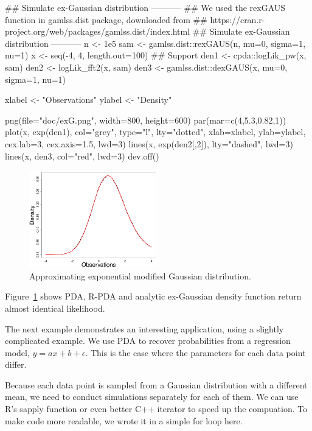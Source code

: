 \documentclass[shortnames,nojss,article]{jss}
\begin{document}
%
\begin{Code}
## Simulate ex-Gaussian distribution -----------
## We used the rexGAUS function in gamlss.dist package, downloaded from
## https://cran.r-project.org/web/packages/gamlss.dist/index.html
## Simulate ex-Gaussian distribution -----------
n    <- 1e5
sam  <- gamlss.dist::rexGAUS(n, mu=0, sigma=1, nu=1)
x    <- seq(-4, 4, length.out=100) ## Support
den1 <- cpda::logLik_pw(x, sam)
den2 <- logLik_fft2(x, sam)
den3 <- gamlss.dist::dexGAUS(x, mu=0, sigma=1, nu=1)

xlabel <- "Observations"
ylabel <- "Density"


png(file="doc/exG.png", width=800, height=600)
par(mar=c(4,5.3,0.82,1))
plot(x, exp(den1), col="grey", type="l", lty="dotted", xlab=xlabel, ylab=ylabel,
  cex.lab=3, cex.axis=1.5, lwd=3)
lines(x, exp(den2[,2]), lty="dashed", lwd=3)
lines(x, den3, col="red", lwd=3)
dev.off()

\end{Code}
%

\begin{figure}[htbp]
\begin{center}
    \includegraphics[width=0.5\textwidth]{figs/exG}
      \caption{Approximating exponential modified Gaussian distribution.}
      \label{fig:exG}
\end{center}
\end{figure}

Figure~\ref{fig:exG} shows PDA, R-PDA and analytic ex-Gaussian density
function return almost identical likelihood.

The next example demonstrates an interesting application, using
a slightly complicated example. We use PDA to recover probabilities from a
regression model, $ y = ax + b + \epsilon $. This is the case where the
parameters for each data point differ.

Because each data point is sampled from a Gaussian distribution
with a different mean, we need to conduct simulations separately for each of 
them. We can use R's sapply function or even better C++ iterator to speed up 
the compuation. To make code more readable, we wrote it in a simple for loop 
here.
\end{document}
